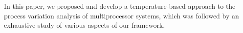 In this paper, we proposed and develop a temperature-based approach to the process variation analysis of multiprocessor systems, which was followed by an exhaustive study of various aspects of our framework.
